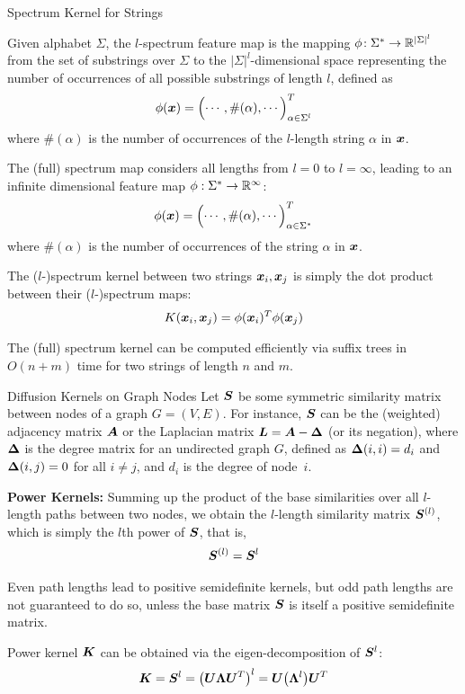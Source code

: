 \begin{frame}{Spectrum Kernel for Strings}

\small
Given alphabet $\Sigma$,  the $l$-spectrum feature map is
the mapping $\phi\!: \Sigma^* \to {\mathord{\mathbb R}}^{|\Sigma|^l}$ from the set of
substrings over $\Sigma$ to the $|\Sigma|^l$-dimensional space
representing the number of occurrences of all possible
substrings of length $l$, def\/{i}ned as
\begin{align*}
  \phi({\boldsymbol x}) = \Bigl( \cdots, \#(\alpha), \cdots \Bigr)^T_{\alpha \in \Sigma^l}
\end{align*}
where $\#(\alpha)$ is the number of occurrences of the $l$-length string
$\alpha$ in ${\boldsymbol x}$.

\medskip
The (full) spectrum map 
considers all lengths from $l=0$ to $l=\infty$, leading to an 
inf\/{i}nite
dimensional feature map $\phi: \Sigma^* \to {\mathord{\mathbb R}}^\infty$:
\begin{align*}
  \phi({\boldsymbol x}) = \Bigl( \cdots,
  \#(\alpha), \cdots \Bigr)^T_{\alpha \in \Sigma^*}
\end{align*}
where $\#(\alpha)$ is the number of occurrences of the string
$\alpha$ in ${\boldsymbol x}$.

\medskip
The ($l$-)spectrum kernel between two strings ${\boldsymbol x}_i, {\boldsymbol x}_{j}$
is simply the dot product between their ($l$-)spectrum maps:
\begin{align*}
  K({\boldsymbol x}_i, {\boldsymbol x}_{j}) = \phi({\boldsymbol x}_i)^T\phi({\boldsymbol x}_{j})
\end{align*}

\medskip
The (full) spectrum kernel can be computed
eff\/{i}ciently via suff\/{i}x trees 
in $O(n + m)$ time for two strings of length $n$ and $m$.
\end{frame}


\begin{frame}{Diffusion Kernels on Graph Nodes}
Let ${\boldsymbol S}$ be some symmetric similarity matrix between nodes of a graph
$G=(V,E)$.  For instance, ${\boldsymbol S}$
can be the (weighted) adjacency matrix ${\boldsymbol A}$ or
the Laplacian matrix ${\boldsymbol L} = {\boldsymbol A} - {\bm \Delta}$ (or its negation),
where ${\bm \Delta}$ is the degree matrix for
an undirected graph $G$, def\/{i}ned as ${\bm \Delta}(i,i) = d_i$ and
${\bm \Delta}(i,j) = 0$ for all $i\ne j$, and $d_i$ is the degree of node~$i$.


\medskip
{\bf Power Kernels:}
Summing up the
product of the base similarities over all $l$-length paths between two
nodes, we obtain the $l$-length similarity matrix ${\boldsymbol S}^{(l)}$,
which is simply the $l$th power of ${\boldsymbol S}$, that is,
\begin{align*}
  {\boldsymbol S}^{(l)} = {\boldsymbol S}^l
\end{align*}

\medskip
Even path lengths lead to positive semidef\/{i}nite kernels, but odd path
lengths are not guaranteed to do so, unless the base matrix ${\boldsymbol S}$ is
itself a positive semidef\/{i}nite matrix.

\medskip
Power kernel ${\boldsymbol K}$ can be obtained via the eigen-decomposition of ${\boldsymbol S}^l$:
\begin{align*}
  {\boldsymbol K} = {\boldsymbol S}^l = \bigl({\boldsymbol U} {\bm \Lambda} {\boldsymbol U}^T\bigr)^l
  = {\boldsymbol U} \bigl({\bm \Lambda}^l\bigr) {\boldsymbol U}^T
\end{align*}

\end{frame}


